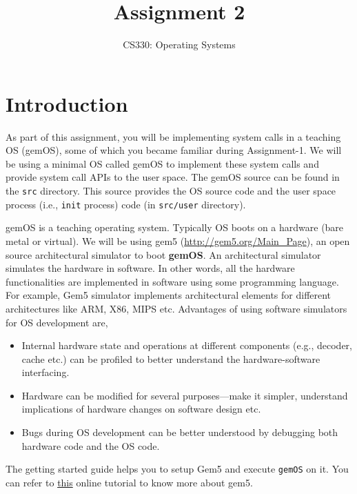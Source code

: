 \documentclass[12pt]{article}
\begin{document}
 
 
\title{Assignment 2}
\author{CS330: Operating Systems}
\date{}

\maketitle

\section{Introduction}

As part of this assignment,
you will be implementing system calls in a teaching OS (gemOS), some of which you became familiar during Assignment-1. 
%
We will be using a minimal OS called gemOS to implement these system calls and provide system call APIs to the user space. 
%
The gemOS source can be found in the {\tt src} directory. This source provides the OS source code and the user space 
process (i.e., {\tt init} process) code (in {\tt src/user} directory).

gemOS is a teaching operating system. Typically OS boots on a hardware (bare metal or virtual). 
We will be using gem5 (\href{http://gem5.org/Main\_Page}{http://gem5.org/Main\_Page}), an open source architectural simulator 
to boot \textbf{gemOS}. An architectural simulator simulates the hardware in software. 
%
In other words, all the hardware functionalities are implemented in software using some programming language. 
%
For example, Gem5 simulator implements architectural elements for different architectures like
ARM, X86, MIPS etc.
%
Advantages of using software simulators for OS development are,
\begin{itemize}
\item Internal hardware state and operations at different components (e.g., decoder, cache etc.) can be
profiled to better understand the hardware-software interfacing.
\item Hardware can be modified for several purposes---make it simpler, understand implications of 
hardware changes on software design etc.
\item Bugs during OS development can be better understood by debugging both hardware code and the OS code.     
\end{itemize} 
%
The getting started guide helps you to setup Gem5 and execute \texttt{gemOS} on it. 
You can refer to \href{http://learning.gem5.org/book/index.html}{this} online tutorial to know more about gem5.\\
\end{document}
